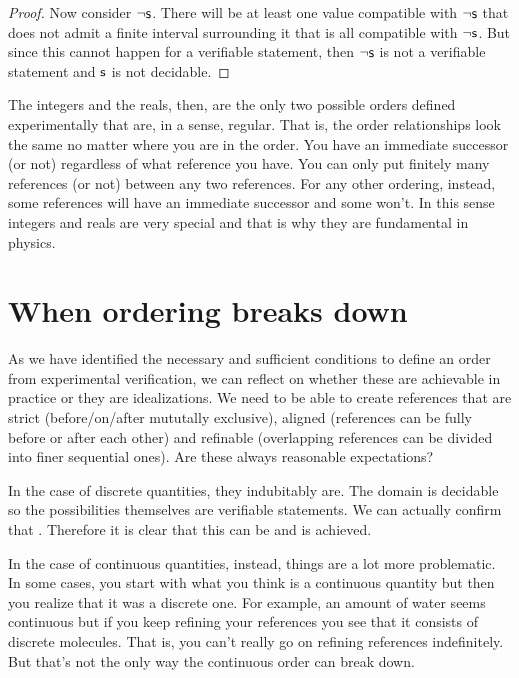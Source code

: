 \documentclass[11pt,letterpaper,fleqn]{memoir} %
\begin{document}
\begin{mathSection}
\begin{proof}
	Now consider $\neg \mathsf{s}$. There will be at least one value compatible with $\neg \mathsf{s}$ that does not admit a finite interval surrounding it that is all compatible with $\neg \mathsf{s}$. But since this cannot happen for a verifiable statement, then $\neg \mathsf{s}$ is not a verifiable statement and $\mathsf{s}$ is not decidable.
\end{proof}
\end{mathSection}

The integers and the reals, then, are the only two possible orders defined experimentally that are, in a sense, regular. That is, the order relationships look the same no matter where you are in the order. You have an immediate successor (or not) regardless of what reference you have. You can only put finitely many references (or not) between any two references. For any other ordering, instead, some references will have an immediate successor and some won't. In this sense integers and reals are very special and that is why they are fundamental in physics.

\section{When ordering breaks down}

As we have identified the necessary and sufficient conditions to define an order from experimental verification, we can reflect on whether these are achievable in practice or they are idealizations. We need to be able to create references that are strict (before/on/after mututally exclusive), aligned (references can be fully before or after each other) and refinable (overlapping references can be divided into finer sequential ones). Are these always reasonable expectations?

In the case of discrete quantities, they indubitably are. The domain is decidable so the possibilities themselves are verifiable statements. We can actually confirm that . Therefore it is clear that this can be and is achieved.

In the case of continuous quantities, instead, things are a lot more problematic. In some cases, you start with what you think is a continuous quantity but then you realize that it was a discrete one. For example, an amount of water seems continuous but if you keep refining your references you see that it consists of discrete molecules. That is, you can't really go on refining references indefinitely. But that's not the only way the continuous order can break down.
\end{document}
